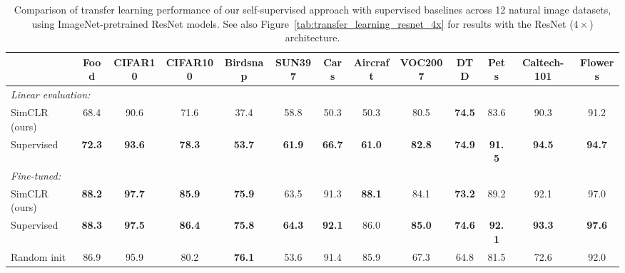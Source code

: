 \documentclass{article}
\begin{document}
\begin{table}[h]
\footnotesize
\centering
\setlength{\tabcolsep}{3pt}
\begin{tabular}{lcccccccccccc}
\toprule
{} &  Food &  CIFAR10 &  CIFAR100 &  Birdsnap &  SUN397 &  Cars &  Aircraft &  VOC2007 &  DTD &  Pets &  Caltech-101 &  Flowers \\
\midrule
\multicolumn{5}{l}{\textit{Linear evaluation:}}\\
SimCLR (ours)    &     68.4 &     90.6 &      71.6 &      37.4 &    58.8 &           50.3 &           50.3 &     80.5 &        \textbf{74.5} &         83.6 &               90.3 &               91.2 \\
Supervised &     \textbf{72.3} &     \textbf{93.6} &      \textbf{78.3} &      \textbf{53.7} &    \textbf{61.9} &           \textbf{66.7} &           \textbf{61.0} &     \textbf{82.8} &        \textbf{74.9} &         \textbf{91.5} &               \textbf{94.5} &               \textbf{94.7} \\
\midrule
\multicolumn{5}{l}{\textit{Fine-tuned:}}\\
SimCLR (ours)    &     \textbf{88.2} &     \textbf{97.7} &      \textbf{85.9} &      \textbf{75.9} &    63.5 &           91.3 &           \textbf{88.1} &     84.1 &        \textbf{73.2} &         89.2 &               92.1 &               97.0 \\
    Supervised &     \textbf{88.3} &     \textbf{97.5} &      \textbf{86.4} &      \textbf{75.8} &    \textbf{64.3} &           \textbf{92.1} &           86.0 &     \textbf{85.0} &        \textbf{74.6} &         \textbf{92.1} &               \textbf{93.3} &               \textbf{97.6}\\
Random init
&     86.9 &     95.9 &      80.2 &      \textbf{76.1} &    53.6 &           91.4 &           85.9 &     67.3 &        64.8 &         81.5 &               72.6 &               92.0 \\
\bottomrule
\end{tabular}
\caption{Comparison of transfer learning performance of our self-supervised approach with supervised baselines across 12 natural image datasets, using ImageNet-pretrained ResNet models. See also Figure~\ref{tab:transfer_learning_resnet_4x} for results with the ResNet ($4 \times$) architecture.}
\label{tab:transfer_learning_resnet}
\end{table}
\end{document}
